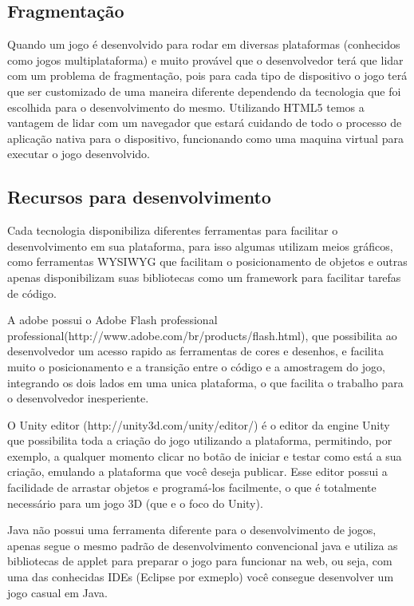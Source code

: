 
\subsection{Fragmentação}

Quando um jogo é desenvolvido para rodar em diversas plataformas
(conhecidos como jogos multiplataforma) e muito provável que o
desenvolvedor terá que lidar com um problema de fragmentação, pois
para cada tipo de dispositivo o jogo terá que ser customizado de uma
maneira diferente dependendo da tecnologia que foi escolhida para o
desenvolvimento do mesmo.
Utilizando HTML5 temos a vantagem de lidar com um navegador que estará
cuidando de todo o processo de aplicação nativa para o dispositivo,
funcionando como uma maquina virtual para executar o jogo
desenvolvido.


\subsection{Recursos para desenvolvimento}

Cada tecnologia disponibiliza diferentes ferramentas para facilitar o
desenvolvimento em sua plataforma, para isso algumas utilizam meios
gráficos, como ferramentas WYSIWYG que facilitam o posicionamento de
objetos e outras apenas disponibilizam suas bibliotecas como um
framework para facilitar tarefas de código.

A adobe possui o Adobe Flash professional
professional(http://www.adobe.com/br/products/flash.html), que
possibilita ao desenvolvedor um acesso rapido as ferramentas de cores
e desenhos, e facilita muito o posicionamento e a transição entre o
código e a amostragem do jogo, integrando os dois lados em uma unica
plataforma, o que facilita o trabalho para o desenvolvedor
inesperiente.

O Unity editor (http://unity3d.com/unity/editor/) é o editor da engine Unity que possibilita toda a
criação do jogo utilizando a plataforma, permitindo, por exemplo, a
qualquer momento clicar no botão de iniciar e testar como está a sua
criação, emulando a plataforma que você deseja publicar.
Esse editor possui a facilidade de arrastar objetos e programá-los
facilmente, o que é totalmente necessário para um jogo 3D (que e o
foco do Unity).

Java não possui uma ferramenta diferente para o desenvolvimento de
jogos, apenas segue o mesmo padrão de desenvolvimento convencional
java e utiliza as bibliotecas de applet para preparar o jogo para
funcionar na web, ou seja, com uma das conhecidas IDEs (Eclipse por
exmeplo) você consegue desenvolver um jogo casual em Java.
